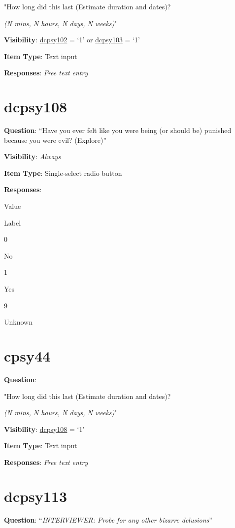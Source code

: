 \documentclass[]{book}
\begin{document}
"How long did this last (Estimate duration and dates)?

\emph{(N mins, N hours, N days, N weeks)}"

\textbf{Visibility}: \protect\hyperlink{dcpsy102}{dcpsy102} = `1' or \protect\hyperlink{dcpsy103}{dcpsy103} = `1'

\textbf{Item Type}: Text input

\textbf{Responses}: \emph{Free text entry}

\hypertarget{dcpsy108}{%
\section{dcpsy108}\label{dcpsy108}}

\textbf{Question}: ``Have you ever felt like you were being (or should be) punished because you were evil? (Explore)''

\textbf{Visibility}: \emph{Always}

\textbf{Item Type}: Single-select radio button

\textbf{Responses}:

Value

Label

0

No

1

Yes

9

Unknown

\hypertarget{cpsy44}{%
\section{cpsy44}\label{cpsy44}}

\textbf{Question}:

"How long did this last (Estimate duration and dates)?

\emph{(N mins, N hours, N days, N weeks)}"

\textbf{Visibility}: \protect\hyperlink{dcpsy108}{dcpsy108} = `1'

\textbf{Item Type}: Text input

\textbf{Responses}: \emph{Free text entry}

\hypertarget{dcpsy113}{%
\section{dcpsy113}\label{dcpsy113}}

\textbf{Question}: ``\emph{INTERVIEWER: Probe for any other bizarre delusions}''
\end{document}
